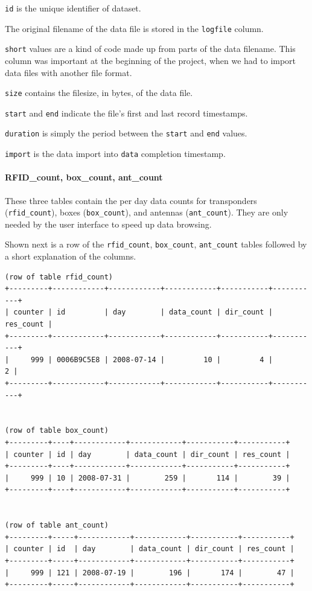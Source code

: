 \begin{mydesc}
\item \lstinline|id| is the unique identifier of dataset.
\item The original filename of the data file is stored in the \lstinline|logfile| column.
\item \lstinline|short| values are a kind of code made up from parts of the data filename. This column was important at the beginning of the project, when we had to import data files with another file format.
\item \lstinline|size| contains the filesize, in bytes, of the data file.
\item \lstinline|start| and \lstinline|end| indicate the file's first and last record timestamps.
\item \lstinline|duration| is simply the period between the \lstinline|start| and \lstinline|end| values.
\item \lstinline|import| is the data import into \lstinline|data| completion timestamp.
\end{mydesc}

\paragraph{RFID\_count, box\_count, ant\_count}
\label{para:counts}

These three tables contain the per day data counts for transponders (\lstinline|rfid_count|), boxes (\lstinline|box_count|), and antennas (\lstinline|ant_count|). They are only needed by the user interface to speed up data browsing.

Shown next is a row of the \lstinline|rfid_count|, \lstinline|box_count|, \lstinline|ant_count| tables followed by a short explanation of the columns.

\codescript
{}
\begin{lstlisting}[frame=none]
(row of table rfid_count)
+---------+------------+------------+------------+-----------+-----------+
| counter | id         | day        | data_count | dir_count | res_count |
+---------+------------+------------+------------+-----------+-----------+
|     999 | 0006B9C5E8 | 2008-07-14 |         10 |         4 |         2 | 
+---------+------------+------------+------------+-----------+-----------+


(row of table box_count)
+---------+----+------------+------------+-----------+-----------+
| counter | id | day        | data_count | dir_count | res_count |
+---------+----+------------+------------+-----------+-----------+
|     999 | 10 | 2008-07-31 |        259 |       114 |        39 | 
+---------+----+------------+------------+-----------+-----------+


(row of table ant_count)
+---------+-----+------------+------------+-----------+-----------+
| counter | id  | day        | data_count | dir_count | res_count |
+---------+-----+------------+------------+-----------+-----------+
|     999 | 121 | 2008-07-19 |        196 |       174 |        47 | 
+---------+-----+------------+------------+-----------+-----------+


\end{lstlisting}

